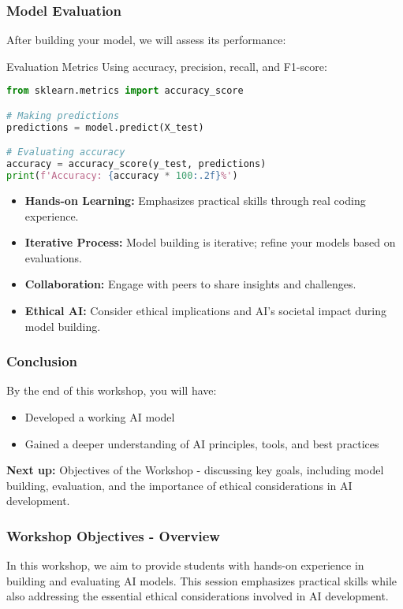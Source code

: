\documentclass{beamer}
\begin{document}
\begin{frame}[fragile]
    \frametitle{Model Evaluation}
    After building your model, we will assess its performance:
    \begin{block}{Evaluation Metrics}
        Using accuracy, precision, recall, and F1-score:
        \begin{lstlisting}[language=Python]
from sklearn.metrics import accuracy_score

# Making predictions
predictions = model.predict(X_test)

# Evaluating accuracy
accuracy = accuracy_score(y_test, predictions)
print(f'Accuracy: {accuracy * 100:.2f}%')
        \end{lstlisting}
    \end{block}
    
    \begin{itemize}
        \item \textbf{Hands-on Learning:} Emphasizes practical skills through real coding experience.
        \item \textbf{Iterative Process:} Model building is iterative; refine your models based on evaluations.
        \item \textbf{Collaboration:} Engage with peers to share insights and challenges.
        \item \textbf{Ethical AI:} Consider ethical implications and AI's societal impact during model building.
    \end{itemize}
\end{frame}

\begin{frame}[fragile]
    \frametitle{Conclusion}
    By the end of this workshop, you will have:
    \begin{itemize}
        \item Developed a working AI model
        \item Gained a deeper understanding of AI principles, tools, and best practices
    \end{itemize}
    \textbf{Next up:} Objectives of the Workshop - discussing key goals, including model building, evaluation, and the importance of ethical considerations in AI development.
\end{frame}

\begin{frame}[fragile]
    \frametitle{Workshop Objectives - Overview}
    In this workshop, we aim to provide students with hands-on experience in building and evaluating AI models. This session emphasizes practical skills while also addressing the essential ethical considerations involved in AI development.
\end{frame}
\end{document}
